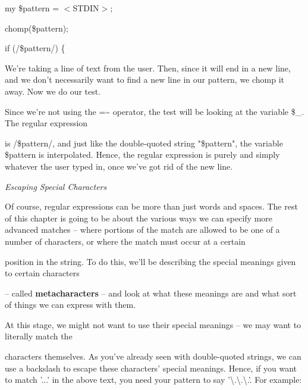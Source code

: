 \documentclass[a4paper,11pt]{book}
\begin{document}
\noindent 

\noindent 

\noindent my \$pattern = $<$STDIN$>$;

\noindent chomp(\$pattern);

\noindent 

\noindent if (/\$pattern/) \{

\noindent 

\noindent We're taking a line of text from the user. Then, since it will end in a new line, and we don't necessarily want to find a new line in our pattern, we chomp it away. Now we do our test.

\noindent 

\noindent Since we're not using the =\~{} operator, the test will be looking at the variable \$\_. The regular expression

\noindent is /\$pattern/, and just like the double-quoted string "\$pattern", the variable \$pattern is interpolated. Hence, the regular expression is purely and simply whatever the user typed in, once we've got rid of the new line.

\noindent 

\noindent \textit{Escaping Special Characters}

\noindent Of  course,  regular expressions  can  be  more  than  just  words  and  spaces.  The  rest of  this chapter  is going  to  be about the  various  ways  we  can  specify  more  advanced  matches  --  where  portions  of  the match are allowed to  be one of  a  number  of characters,  or  where  the  match  must  occur  at  a  certain

\noindent position in the  string.  To  do  this,  we'll  be  describing  the  special  meanings  given  to  certain  characters

\noindent --  called  \textbf{metacharacters }-- and  look  at what  these  meanings  are and  what  sort  of  things  we  can  express with them.

\noindent 

\noindent 

\noindent At this stage, we might not want to use their special meanings -- we may want to literally match the

\noindent characters themselves. As you've already seen with double-quoted strings, we can use a backslash to escape these characters' special meanings. Hence, if you want to match '...' in the above text, you need your pattern to say '\textbackslash .\textbackslash .\textbackslash .'. For example:
\end{document}
